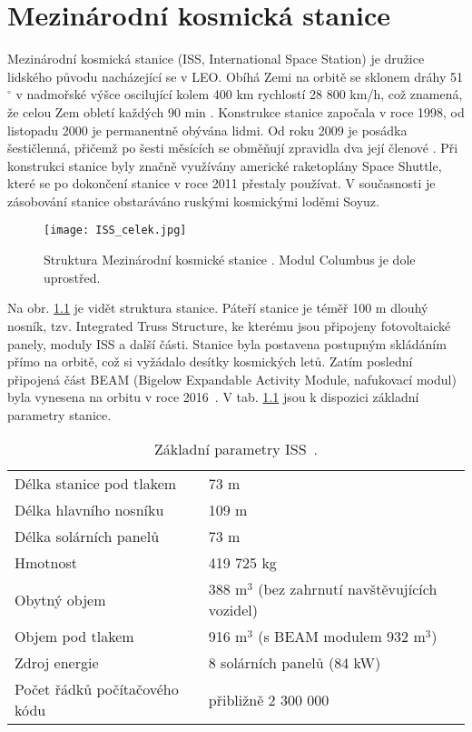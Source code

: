 %
\chapter{Mezinárodní kosmická stanice}
Mezinárodní kosmická stanice (ISS, International Space Station) je družice lidského původu nacházející se v LEO. Obíhá Zemi na orbitě se sklonem dráhy 51$^{\circ}$ \cite{ISS_wiki} v nadmořské výšce oscilující kolem 400 km rychlostí 28 800 km/h, což znamená, že celou Zem obletí každých 90 min \cite{ISS_where}. Konstrukce stanice započala v roce 1998, od listopadu 2000 je permanentně obývána lidmi. Od roku 2009 je posádka šestičlenná, přičemž po šesti měsících se obměňují zpravidla dva její členové \cite{ISS_wiki}. Při konstrukci stanice byly značně využívány americké raketoplány Space Shuttle, které se po dokončení stanice v roce 2011 přestaly používat. V současnosti je zásobování stanice obstaráváno ruskými kosmickými loděmi Soyuz.
\begin{figure}[H]
  \centering
  \texttt{[image: ISS\_celek.jpg]}
  \caption{Struktura Mezinárodní kosmické stanice \cite{ISS_facts}. Modul Columbus je dole uprostřed.}
  \label{fig:ISS_celek}
\end{figure}

Na obr. \ref{fig:ISS_celek} je vidět struktura stanice. Páteří stanice je téměř 100 m dlouhý nosník, tzv. Integrated Truss Structure, ke kterému jsou připojeny fotovoltaické panely, moduly ISS a další části. Stanice byla postavena postupným skládáním přímo na orbitě, což si vyžádalo desítky kosmických letů. Zatím poslední připojená část BEAM (Bigelow Expandable Activity Module, nafukovací modul) byla vynesena na orbitu v roce 2016~\cite{ISS_gifs}. V tab. \ref{tab:ISS_parametry} jsou k dispozici základní parametry stanice.
\begin{table}[h]
  \centering
  \caption{Základní parametry ISS~\cite{ISS_facts}.}
  \label{tab:ISS_parametry}
  \begin{tabular}{ll}
    \toprule
    Délka stanice pod tlakem &73 m\\
    Délka hlavního nosníku&109 m\\
    Délka solárních panelů&73 m\\
    Hmotnost&419 725 kg\\
    Obytný objem& 388 m$^3$ (bez zahrnutí navštěvujících vozidel)\\
    Objem pod tlakem&916 m$^3$ (s BEAM modulem 932 m$^3$)\\
    Zdroj energie& 8 solárních panelů (84 kW)\\
    Počet řádků počítačového kódu& přibližně 2 300 000 \\
    \bottomrule
  \end{tabular}
\end{table}

